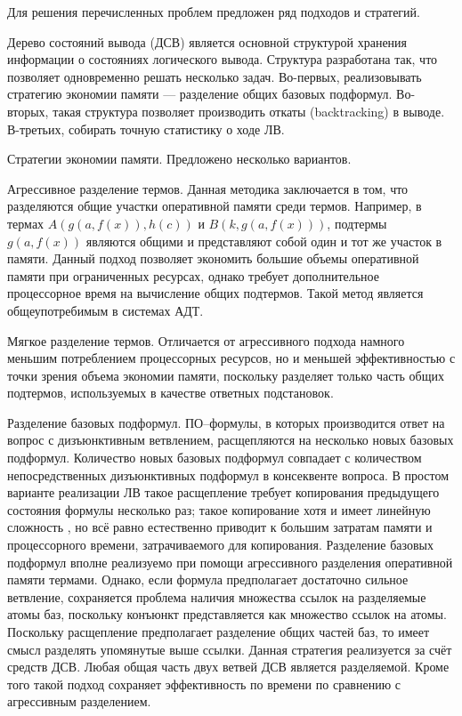 \documentclass[a4paper]{report}
\begin{document}
Для решения перечисленных проблем предложен ряд подходов и стратегий.

Дерево состояний вывода (ДСВ) является основной структурой хранения информации о состояниях логического вывода. Структура разработана так, что позволяет одновременно решать несколько задач. Во-первых, реализовывать стратегию экономии памяти --- разделение общих базовых подформул. Во-вторых, такая структура позволяет производить откаты (backtracking) в выводе. В-третьих, собирать точную статистику о ходе ЛВ.

Стратегии экономии памяти. Предложено несколько вариантов.

Агрессивное разделение термов. Данная методика заключается в том, что разделяются общие участки оперативной памяти среди термов. Например, в термах $A(g(a,f(x)),h(c))$ и $B(k,g(a,f(x)))$, подтермы $g(a,f(x))$ являются общими и представляют собой один и тот же участок в памяти. Данный подход позволяет экономить большие объемы оперативной памяти при ограниченных ресурсах, однако требует дополнительное процессорное время на вычисление общих подтермов. Такой метод является общеупотребимым в системах АДТ.

Мягкое разделение термов. Отличается от агрессивного подхода намного меньшим потреблением процессорных ресурсов, но и меньшей эффективностью с точки зрения объема экономии памяти, поскольку разделяет только часть общих подтермов, используемых в качестве ответных подстановок.

Разделение базовых подформул. ПО--формулы, в которых производится ответ на вопрос с дизъюнктивным ветвлением, расщепляются на несколько новых базовых подформул. Количество новых базовых подформул совпадает с количеством непосредственных дизъюнктивных подформул в консеквенте вопроса. В простом варианте реализации ЛВ \cite{dissChe} такое расщепление требует копирования предыдущего состояния формулы несколько раз; такое копирование хотя и имеет линейную сложность \cite{Che2}, но всё равно естественно приводит к большим затратам памяти и процессорного времени, затрачиваемого для копирования. Разделение базовых подформул вполне реализуемо при помощи агрессивного разделения оперативной памяти термами. Однако, если формула предполагает достаточно сильное ветвление, сохраняется проблема наличия множества ссылок на разделяемые атомы баз, поскольку конъюнкт представляется как множество ссылок на атомы. Поскольку расщепление предполагает разделение общих частей баз, то имеет смысл разделять упомянутые выше ссылки. Данная стратегия реализуется за счёт средств ДСВ. Любая общая часть двух ветвей ДСВ является разделяемой. Кроме того такой подход сохраняет эффективность по времени по сравнению с агрессивным разделением.
\end{document}
